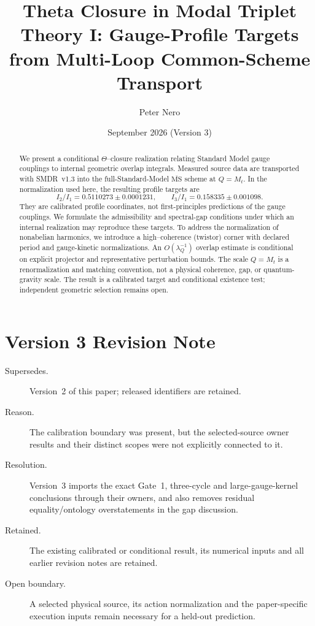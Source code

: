 \documentclass[11pt]{article}
\title{Theta Closure in Modal Triplet Theory I:
Gauge-Profile Targets from Multi-Loop Common-Scheme Transport}
\author{Peter Nero}
\date{September 2026 (Version 3)}
\begin{document}
\maketitle
\begin{abstract}
We present a conditional $\Theta$--closure realization relating Standard Model
gauge couplings to internal geometric overlap integrals.  Measured source data
are transported with SMDR~v1.3 into the full-Standard-Model
$\overline{\mathrm{MS}}$ scheme at $Q=M_t$.  In the normalization used here,
the resulting profile targets are
\[
 I_2/I_1=0.5110273\pm0.0001231,\qquad
 I_3/I_1=0.158335\pm0.001098.
\]
They are calibrated profile coordinates, not first-principles predictions of
the gauge couplings.  We formulate the admissibility and spectral-gap
conditions under which an internal realization may reproduce these targets.
To address the normalization of nonabelian harmonics, we introduce a
high--coherence (twistor) corner with declared period and gauge-kinetic
normalizations. An $O(\lambda_Q^{-1})$ overlap estimate is conditional on
explicit projector and representative perturbation bounds.
The scale $Q=M_t$ is a renormalization and matching convention, not a physical
coherence, gap, or quantum-gravity scale.  The result is a calibrated target
and conditional existence test; independent geometric selection remains open.
\end{abstract}

\section*{Version 3 Revision Note}
\label{sec:revision-v3}
\begin{description}
\item[Supersedes.] Version~2 of this paper; released identifiers are retained.
\item[Reason.] The calibration boundary was present, but the selected-source
owner results and their distinct scopes were not explicitly connected to it.
\item[Resolution.] Version~3 imports the exact Gate~1, three-cycle and
large-gauge-kernel conclusions through their owners, and also removes residual equality/ontology overstatements in the gap discussion.
\item[Retained.] The existing calibrated or conditional result, its numerical
inputs and all earlier revision notes are retained.
\item[Open boundary.] A selected physical source, its action normalization and
the paper-specific execution inputs remain necessary for a held-out prediction.
\end{description}
\end{document}
